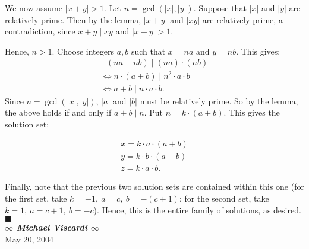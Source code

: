 \documentclass[11pt]{article}
\begin{document}
We now assume $\left|x+y\right| > 1 $.  
Let $n = \gcd\left(\left|x\right|,\left|y\right|\right)$.  Suppose that $\left|x\right|$ and $\left|y\right|$ are relatively prime.  
Then by the lemma, $\left|x+y\right|$ and $\left|xy\right|$ are relatively prime, a contradiction, since $x+y \mid xy$ and $\left|x+y\right| > 1 $.

\noindent Hence, $n > 1$.  Choose integers $a, b$ such that $x = na$ and $y = nb$.
This gives:
$$ \begin{array}{l}
	\ \  \ \left(na + nb\right) \mid \left(na\right) \cdot \left(nb\right) \\ 
	\Leftrightarrow n \cdot \left(a+b\right) \mid n^2 \cdot a \cdot b \\ 
	\Leftrightarrow a+b \mid n \cdot a \cdot b. 
\end{array} $$
Since $n = \gcd\left(\left|x\right|,\left|y\right|\right)$, $\left|a\right|$ and $\left|b\right|$ must be relatively prime.
So by the lemma, the above holds if and only if $a+b \mid n$.  Put $n = k \cdot \left(a + b\right)$.  This gives the solution set:

$$ \begin{array}{l}
	x = k \cdot a \cdot \left(a + b\right) \\
	y = k \cdot b \cdot \left(a + b\right) \\
	z = k \cdot a \cdot b.
\end{array} $$

\noindent Finally, note that the previous two solution sets are contained within this one (for the first set, take $k = -1, \ a = c, \ b = -\left(c+1\right)$; for the second set, take $k = 1, \ a = c+1, \ b= -c$).  Hence, this is the entire family of solutions, as desired.
\noindent   {} $\blacksquare$ \\

\noindent \textbf{\textit{$\infty$ Michael Viscardi $\infty$}} \\

\noindent May 20, 2004
\end{document}
